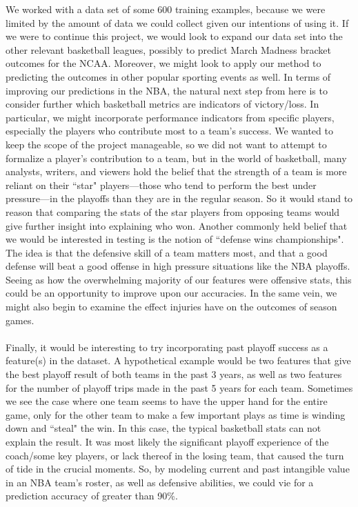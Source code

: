 \documentclass[letterpaper]{article} %
\begin{document}
We worked with a data set of some 600 training examples, because we were limited by the amount of data we could collect given our intentions of using it. If we were to continue this project, we would look to expand our data set into the other relevant basketball leagues, possibly to predict March Madness bracket outcomes for the NCAA. Moreover, we might look to apply our method to predicting the outcomes in other popular sporting events as well. In terms of improving our predictions in the NBA, the natural next step from here is to consider further which basketball metrics are indicators of victory/loss. In particular, we might incorporate performance indicators from specific players, especially the players who contribute most to a team's success. We wanted to keep the scope of the project manageable, so we did not want to attempt to formalize a player's contribution to a team, but in the world of basketball, many analysts, writers, and viewers hold the belief that the strength of a team is more reliant on their ``star" players---those who tend to perform the best under pressure---in the playoffs than they are in the regular season. So it would stand to reason that comparing the stats of the star players from opposing teams would give further insight into explaining who won. Another commonly held belief that we would be interested in testing is the notion of ``defense wins championships". The idea is that the defensive skill of a team matters most, and that a good defense will beat a good offense in high pressure situations like the NBA playoffs. Seeing as how the overwhelming majority of our features were offensive stats, this could be an opportunity to improve upon our accuracies. In the same vein, we might also begin to examine the effect injuries have on the outcomes of season games. \\ \\
Finally, it would be interesting to try incorporating past playoff success as a feature(s) in the dataset. A hypothetical example would be two features that give the best playoff result of both teams in the past 3 years, as well as two features for the number of playoff trips made in the past 5 years for each team. Sometimes we see the case where one team seems to have the upper hand for the entire game, only for the other team to make a few important plays as time is winding down and ``steal" the win. In this case, the typical basketball stats can not explain the result. It was most likely the significant playoff experience of the coach/some key players, or lack thereof in the losing team, that caused the turn of tide in the crucial moments. So, by modeling current and past intangible value in an NBA team's roster, as well as defensive abilities, we could vie for a prediction accuracy of greater than 90\%.

\newpage


\end{document}
